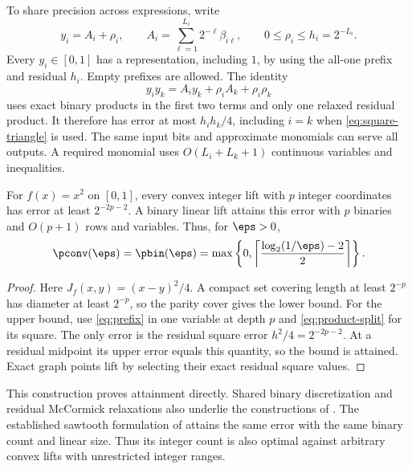 To share precision across expressions, write
\begin{equation}\label{eq:prefix}
 y_i=A_i+\rho_i,\qquad
 A_i=\sum_{\ell=1}^{L_i}2^{-\ell}\beta_{i\ell},\qquad
 0\le\rho_i\le h_i=2^{-L_i}.
\end{equation}
Every $y_i\in[0,1]$ has a representation, including $1$, by using the
all-one prefix and residual $h_i$. Empty prefixes are allowed.
The identity
\begin{equation}\label{eq:product-split}
 y_i y_k=A_i y_k+\rho_i A_k+\rho_i\rho_k
\end{equation}
uses exact binary products in the first two terms and only one relaxed
residual product. It therefore has error at most $h_i h_k/4$, including
$i=k$ when \eqref{eq:square-triangle} is used. The same input bits and
approximate monomials can serve all outputs. A required monomial uses
$O(L_i+L_k+1)$ continuous variables and inequalities.

\begin{theorem}\label{thm:square}
For $f(x)=x^2$ on $[0,1]$, every convex integer lift with $p$ integer
coordinates has error at least $2^{-2p-2}$. A binary linear lift attains
this error with $p$ binaries and $O(p+1)$ rows and variables. Thus, for
$\eps>0$,
\[
 \pconv(\eps)=\pbin(\eps)
 =\max\left\{0,\left\lceil\frac{\log_2(1/\eps)-2}{2}\right\rceil\right\}.
\]
\end{theorem}
\begin{proof}
Here $J_f(x,y)=(x-y)^2/4$. A compact set covering length at least
$2^{-p}$ has diameter at least $2^{-p}$, so the parity cover gives the
lower bound. For the upper bound, use \eqref{eq:prefix} in one variable
at depth $p$ and \eqref{eq:product-split} for its square. The only error
is the residual square error $h^2/4=2^{-2p-2}$. At a residual midpoint
its upper error equals this quantity, so the bound is attained. Exact
graph points lift by selecting their exact residual square values.
\end{proof}

This construction proves attainment directly. Shared binary discretization and residual McCormick relaxations also underlie the constructions of \citet{beach2024b}. The established sawtooth
formulation of \citet{beach2024} attains the same error with the same
binary count and linear size. Thus its integer count is also optimal
against arbitrary convex lifts with unrestricted integer ranges.

